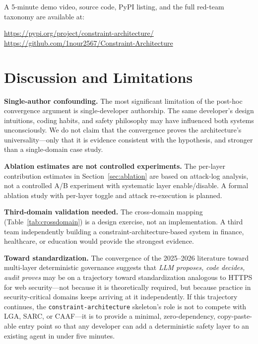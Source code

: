 \documentclass[letterpaper]{article}
\begin{document}
A 5-minute demo video, source code, PyPI listing, and the full red-team
taxonomy are available at:

\begin{center}
\url{https://pypi.org/project/constraint-architecture/}
\qquad
\url{https://github.com/1nour2567/Constraint-Architecture}
\end{center}

\section{Discussion and Limitations}

\textbf{Single-author confounding.} The most significant limitation of the
post-hoc convergence argument is single-developer authorship.  The same
developer's design intuitions, coding habits, and safety philosophy may have
influenced both systems unconsciously.  We do not claim that the convergence
proves the architecture's universality---only that it is evidence consistent
with the hypothesis, and stronger than a single-domain case study.

\textbf{Ablation estimates are not controlled experiments.} The per-layer
contribution estimates in Section~\ref{sec:ablation} are based on attack-log
analysis, not a controlled A/B experiment with systematic layer
enable/disable.  A formal ablation study with per-layer toggle and attack
re-execution is planned.

\textbf{Third-domain validation needed.} The cross-domain mapping
(Table~\ref{tab:crossdomain}) is a design exercise, not an implementation.
A third team independently building a constraint-architecture-based system in
finance, healthcare, or education would provide the strongest evidence.

\textbf{Toward standardization.} The convergence of the 2025--2026 literature
toward multi-layer deterministic governance suggests that
\textit{LLM proposes, code decides, audit proves} may be on a trajectory toward
standardization analogous to HTTPS for web security---not because it is
theoretically required, but because practice in security-critical domains
keeps arriving at it independently.  If this trajectory continues, the
\texttt{constraint-architecture} skeleton's role is not to compete with LGA,
SARC, or CAAF---it is to provide a minimal, zero-dependency, copy-paste-able
entry point so that any developer can add a deterministic safety layer to an
existing agent in under five minutes.
\end{document}
